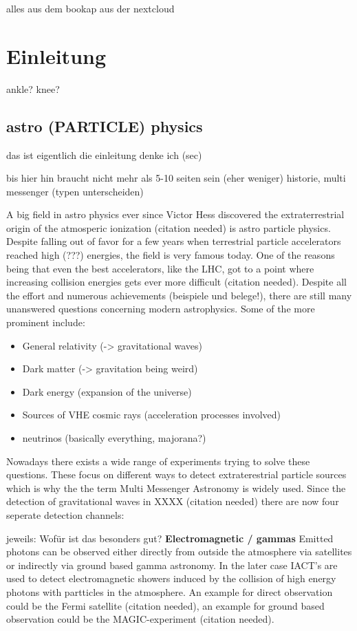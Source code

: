 alles aus dem bookap aus der nextcloud

\chapter{Einleitung}


ankle? knee?

\section{astro (PARTICLE) physics}
das ist eigentlich die einleitung denke ich (sec)

bis hier hin braucht nicht mehr als 5-10 seiten sein (eher weniger)
historie, multi messenger (typen unterscheiden)


A big field in astro physics ever since Victor Hess discovered
the extraterrestrial origin of the atmosperic ionization (citation needed)
is astro particle physics. Despite falling out of favor for a few years
when terrestrial particle accelerators reached high (???) energies,
the field is very famous today. One of the reasons being that
even the best accelerators, like the LHC, got to a point where
increasing collision energies gets ever more difficult (citation needed).
Despite all the effort and numerous achievements (beispiele und belege!),
there are still many unanswered questions concerning modern
astrophysics. Some of the more prominent include:
\begin{itemize}
    \item{General relativity (-> gravitational waves)}
    \item{Dark matter (-> gravitation being weird)}
    \item{Dark energy (expansion of the universe)}
    \item{Sources of VHE cosmic rays (acceleration processes involved)}
    \item{neutrinos (basically everything, majorana?)}
\end{itemize}

Nowadays there exists a wide range of experiments trying to
solve these questions. These focus on different ways to detect
extraterestrial particle sources which is why the
the term Multi Messenger Astronomy is widely used.
Since the detection of gravitational waves in XXXX (citation needed)
there are now four seperate detection channels:

jeweils: Wofür ist das besonders gut?
\textbf{Electromagnetic / gammas}
Emitted photons can be observed either directly
from outside the atmosphere via satellites or indirectly
via ground based gamma astronomy. In the later case
IACT's are used to detect electromagnetic showers induced
by the collision of high energy photons with partticles in the atmosphere.
An example for direct observation could be the Fermi satellite (citation needed),
an example for ground based observation could be the
MAGIC-experiment (citation needed).

